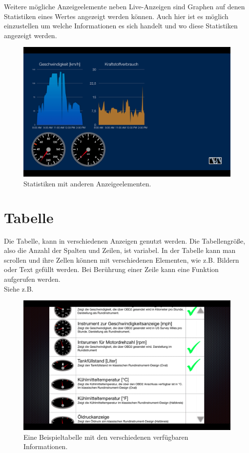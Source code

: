 \documentclass[pflichtenheft.tex]{subfiles}
\begin{document}
Weitere mögliche Anzeigeelemente neben Live-Anzeigen sind Graphen auf denen Statistiken eines Wertes angezeigt werden können. Auch hier ist es möglich einzustellen um welche Informationen es sich handelt und wo diese Statistiken angezeigt werden.
\begin{figure}[H]
  	\begin{center}
 		\includegraphics[width=\textwidth]{Images/GUI-DashStatistic.png}
  		\caption{Statistiken mit anderen Anzeigeelementen.}
  	\end{center}
\end{figure}

\clearpage
\section{Tabelle}

Die Tabelle, kann in verschiedenen Anzeigen genutzt werden. Die Tabellengröße, also die Anzahl der Spalten und Zeilen, ist variabel. In der Tabelle kann man scrollen und ihre Zellen können mit verschiedenen Elementen, wie z.B. Bildern oder Text gefüllt werden. Bei Berührung einer Zeile kann eine Funktion aufgerufen werden.\\
Siehe z.B. ~

\begin{figure}[H]
  	\begin{center}
 		\includegraphics[width=\textwidth]{Images/GUI-Table.png}
  		\caption{Eine Beispieltabelle mit den verschiedenen verfügbaren Informationen.}
  	\end{center}
\end{figure}
\end{document}
